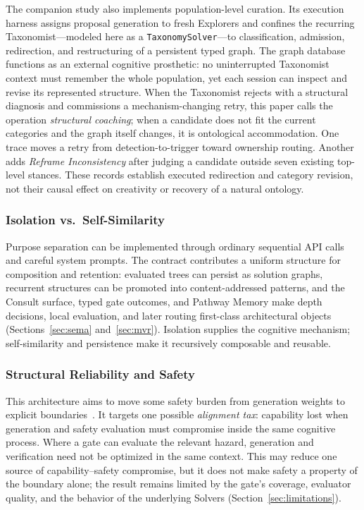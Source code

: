 \documentclass[11pt]{article}
\let\oldtexttt\texttt
\renewcommand{\texttt}[1]{\oldtexttt{\small #1}}
\begin{document}
The companion study also implements population-level curation. Its execution harness assigns proposal generation to fresh Explorers and confines the recurring Taxonomist---modeled here as a \texttt{TaxonomySolver}---to classification, admission, redirection, and restructuring of a persistent typed graph. The graph database functions as an external cognitive prosthetic: no uninterrupted Taxonomist context must remember the whole population, yet each session can inspect and revise its represented structure. When the Taxonomist rejects with a structural diagnosis and commissions a mechanism-changing retry, this paper calls the operation \emph{structural coaching}; when a candidate does not fit the current categories and the graph itself changes, it is ontological accommodation. One trace moves a retry from detection-to-trigger toward ownership routing. Another adds \emph{Reframe Inconsistency} after judging a candidate outside seven existing top-level stances. These records establish executed redirection and category revision, not their causal effect on creativity or recovery of a natural ontology.

\subsubsection{Isolation vs.\ Self-Similarity}

Purpose separation can be implemented through ordinary sequential API calls and careful system prompts. The contract contributes a uniform structure for composition and retention: evaluated trees can persist as solution graphs, recurrent structures can be promoted into content-addressed patterns, and the Consult surface, typed gate outcomes, and Pathway Memory make depth decisions, local evaluation, and later routing first-class architectural objects (Sections~\ref{sec:sema} and~\ref{sec:mvr}). Isolation supplies the cognitive mechanism; self-similarity and persistence make it recursively composable and reusable.

\subsubsection{Structural Reliability and Safety}

This architecture aims to move some safety burden from generation weights to explicit boundaries~\cite{Huang2025}. It targets one possible \emph{alignment tax}: capability lost when generation and safety evaluation must compromise inside the same cognitive process. Where a gate can evaluate the relevant hazard, generation and verification need not be optimized in the same context. This may reduce one source of capability--safety compromise, but it does not make safety a property of the boundary alone; the result remains limited by the gate's coverage, evaluator quality, and the behavior of the underlying Solvers (Section~\ref{sec:limitations}).
\end{document}
